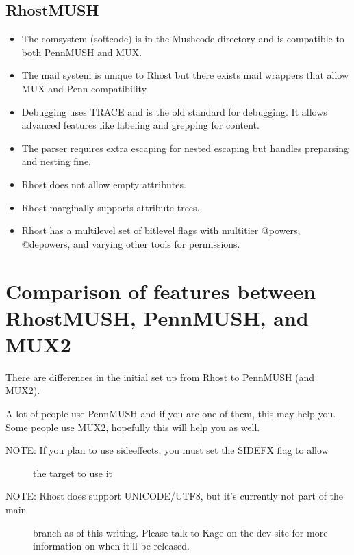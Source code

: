 \documentclass[letterpaper,10pt,english]{sphinxmanual}
\begin{document}
\subsection{RhostMUSH}
\label{\detokenize{differences:rhostmush}}\begin{itemize}
\item {} 
\sphinxAtStartPar
The comsystem (softcode) is in the Mushcode directory and is compatible to both PennMUSH and MUX.

\item {} 
\sphinxAtStartPar
The mail system is unique to Rhost but there exists mail wrappers that allow MUX and Penn compatibility.

\item {} 
\sphinxAtStartPar
Debugging uses TRACE and is the old standard for debugging.  It allows advanced features like labeling and grepping for content.

\item {} 
\sphinxAtStartPar
The parser requires extra escaping for nested escaping but handles pre\sphinxhyphen{}parsing and nesting fine.

\item {} 
\sphinxAtStartPar
Rhost does not allow empty attributes.

\item {} 
\sphinxAtStartPar
Rhost marginally supports attribute trees.

\item {} 
\sphinxAtStartPar
Rhost has a multi\sphinxhyphen{}level set of bitlevel flags with multi\sphinxhyphen{}tier @powers, @depowers, and varying other tools for permissions.

\end{itemize}


\section{Comparison of features between RhostMUSH, PennMUSH, and MUX2}
\label{\detokenize{differences:comparison-of-features-between-rhostmush-pennmush-and-mux2}}
\sphinxAtStartPar
There are differences in the initial set up from Rhost to PennMUSH (and MUX2).

\sphinxAtStartPar
A lot of people use PennMUSH and if you are one of them, this may help you.
Some people use MUX2, hopefully this will help you as well.
\begin{description}
\item[{NOTE:  If you plan to use sideeffects, you must set the SIDEFX flag to allow}] \leavevmode
\sphinxAtStartPar
the target to use it

\item[{NOTE:  Rhost does support UNICODE/UTF8, but it’s currently not part of the main}] \leavevmode
\sphinxAtStartPar
branch as of this writing.  Please talk to Kage on the dev site for more
information on when it’ll be released.

\end{description}
\end{document}
